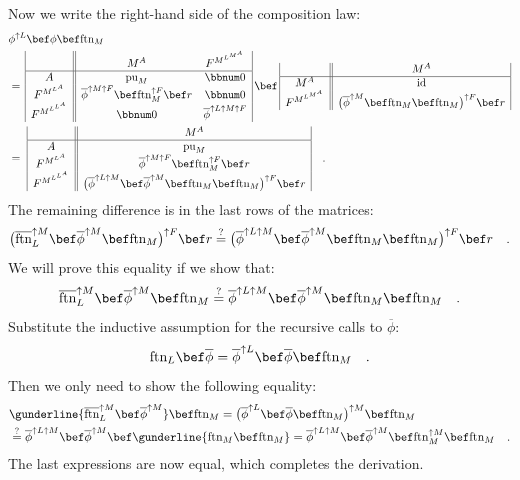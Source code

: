Now we write the right-hand side of the composition law:
\begin{align*}
 & \phi^{\uparrow L}\bef\phi\bef\text{ftn}_{M}\\
 & =\,\begin{array}{|c||cc|}
 & M^{A} & F^{M^{L^{M^{A}}}}\\
\hline A & \text{pu}_{M} & \bbnum 0\\
F^{M^{L^{A}}} & \overline{\phi}^{\uparrow M\uparrow F}\bef\text{ftn}_{M}^{\uparrow F}\bef r & \bbnum 0\\
F^{M^{L^{L^{A}}}} & \bbnum 0 & \overline{\phi}^{\uparrow L\uparrow M\uparrow F}
\end{array}\,\bef\,\begin{array}{|c||c|}
 & M^{A}\\
\hline M^{A} & \text{id}\\
F^{M^{L^{M^{A}}}} & \big(\overline{\phi}^{\uparrow M}\bef\text{ftn}_{M}\bef\text{ftn}_{M}\big)^{\uparrow F}\bef r
\end{array}\\
 & =\,\,\begin{array}{|c||c|}
 & M^{A}\\
\hline A & \text{pu}_{M}\\
F^{M^{L^{A}}} & \overline{\phi}^{\uparrow M\uparrow F}\bef\text{ftn}_{M}^{\uparrow F}\bef r\\
F^{M^{L^{L^{A}}}} & \big(\overline{\phi}^{\uparrow L\uparrow M}\bef\overline{\phi}^{\uparrow M}\bef\text{ftn}_{M}\bef\text{ftn}_{M}\big)^{\uparrow F}\bef r
\end{array}\quad.
\end{align*}
The remaining difference is in the last rows of the matrices:
\[
\big(\overline{\text{ftn}}_{L}^{\uparrow M}\bef\overline{\phi}^{\uparrow M}\bef\text{ftn}_{M}\big)^{\uparrow F}\bef r\overset{?}{=}\big(\overline{\phi}^{\uparrow L\uparrow M}\bef\overline{\phi}^{\uparrow M}\bef\text{ftn}_{M}\bef\text{ftn}_{M}\big)^{\uparrow F}\bef r\quad.
\]
We will prove this equality if we show that:
\[
\overline{\text{ftn}}_{L}^{\uparrow M}\bef\overline{\phi}^{\uparrow M}\bef\text{ftn}_{M}\overset{?}{=}\overline{\phi}^{\uparrow L\uparrow M}\bef\overline{\phi}^{\uparrow M}\bef\text{ftn}_{M}\bef\text{ftn}_{M}\quad.
\]
Substitute the inductive assumption for the recursive calls to $\overline{\phi}$:
\[
\text{ftn}_{L}\bef\overline{\phi}=\overline{\phi}^{\uparrow L}\bef\overline{\phi}\bef\text{ftn}_{M}\quad.
\]
Then we only need to show the following equality:
\begin{align*}
 & \gunderline{\overline{\text{ftn}}_{L}^{\uparrow M}\bef\overline{\phi}^{\uparrow M}}\bef\text{ftn}_{M}=\big(\overline{\phi}^{\uparrow L}\bef\overline{\phi}\bef\text{ftn}_{M}\big)^{\uparrow M}\bef\text{ftn}_{M}\\
 & \overset{?}{=}\overline{\phi}^{\uparrow L\uparrow M}\bef\overline{\phi}^{\uparrow M}\bef\gunderline{\text{ftn}_{M}\bef\text{ftn}_{M}}=\overline{\phi}^{\uparrow L\uparrow M}\bef\overline{\phi}^{\uparrow M}\bef\text{ftn}_{M}^{\uparrow M}\bef\text{ftn}_{M}\quad.
\end{align*}
The last expressions are now equal, which completes the derivation.

